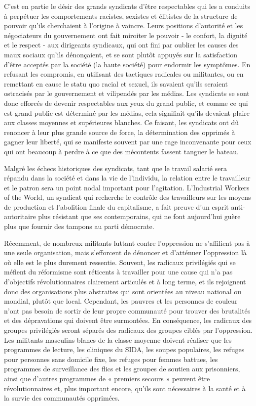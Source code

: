 C'est en partie le désir des grands syndicats d'être respectables qui les a conduits à perpétuer les comportements racistes, sexistes et élitistes de la structure de pouvoir qu'ils cherchaient à l'origine à vaincre. Leurs positions d'autorité et les négociateurs du gouvernement ont fait miroiter le pouvoir - le confort, la dignité et le respect - aux dirigeants syndicaux, qui ont fini par oublier les causes des maux sociaux qu'ils dénonçaient, et se sont plutôt appuyés sur la satisfaction d'être acceptés par la société (la haute société) pour endormir les symptômes. En refusant les compromis, en utilisant des tactiques radicales ou militantes, ou en remettant en cause le statu quo racial et sexuel, ils savaient qu'ils seraient ostracisés par le gouvernement et vilipendés par les médias. Les syndicats se sont donc efforcés de devenir respectables aux yeux du grand public, et comme ce qui est grand public est déterminé par les médias, cela signifiait qu'ils devaient plaire aux classes moyennes et supérieures blanches. Ce faisant, les syndicats ont dû renoncer à leur plus grande source de force, la détermination des opprimés à gagner leur liberté, qui se manifeste souvent par une rage inconvenante pour ceux qui ont beaucoup à perdre à ce que des mécontents fassent tanguer le bateau.

Malgré les échecs historiques des syndicats, tant que le travail salarié sera répandu dans la société et dans la vie de l'individu, la relation entre le travailleur et le patron sera un point nodal important pour l'agitation. L'Industrial Workers of the World, un syndicat qui recherche le contrôle des travailleurs sur les moyens de production et l'abolition finale du capitalisme, a fait preuve d'un esprit anti-autoritaire plus résistant que ses contemporains, qui ne font aujourd'hui guère plus que fournir des tampons au parti démocrate.

Récemment, de nombreux militants luttant contre l'oppression ne s'affilient pas à une seule organisation, mais s'efforcent de dénoncer et d'atténuer l'oppression là où elle est le plus durement ressentie. Souvent, les radicaux privilégiés qui se méfient du réformisme sont réticents à travailler pour une cause qui n'a pas d'objectifs révolutionnaires clairement articulés et à long terme, et ils rejoignent donc des organisations plus abstraites qui sont orientées au niveau national ou mondial, plutôt que local. Cependant, les pauvres et les personnes de couleur n'ont pas besoin de sortir de leur propre communauté pour trouver des brutalités et des dépravations qui doivent être surmontées. En conséquence, les radicaux des groupes privilégiés seront séparés des radicaux des groupes ciblés par l'oppression. Les militants masculins blancs de la classe moyenne doivent réaliser que les programmes de lecture, les cliniques du SIDA, les soupes populaires, les refuges pour personnes sans domicile fixe, les refuges pour femmes battues, les programmes de surveillance des flics et les groupes de soutien aux prisonniers, ainsi que d'autres programmes de « premiers secours » peuvent être révolutionnaires et, plus important encore, qu'ils sont nécessaires à la santé et à la survie des communautés opprimées.


